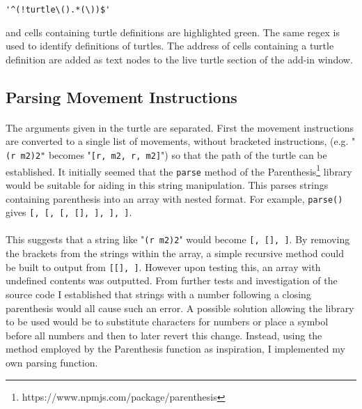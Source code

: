 \begin{verbatim}
'^(!turtle\().*(\))$'
\end{verbatim}

and cells containing turtle definitions are highlighted green. The same regex is used to identify definitions of turtles. The address of cells containing a turtle definition are added as text nodes to the live turtle section of the add-in window.

\subsection{Parsing Movement Instructions}

\paragraph{} The arguments given in the turtle are separated. First the movement instructions are converted to a single list of movements, without bracketed instructions, (e.g. "\texttt{(r m2)2"} becomes "\texttt{[r, m2, r, m2]}") so that the path of the turtle can be established. It initially seemed that the \texttt{parse} method of the Parenthesis\footnote{https://www.npmjs.com/package/parenthesis} library would be suitable for aiding in this string manipulation. This parses strings containing parenthesis into an array with nested format. For example, \texttt{parse()} gives \texttt{[, [\upquote{b[}, [, [], \upquote{\}}], \upquote{]}], \upquote{)}]}.

\paragraph{} This suggests that a string like "\texttt{(r m2)2}" would become \texttt{[\upquote{(}, [], ]}.  By removing the brackets from the strings within the array, a simple recursive method could be built to output \texttt{} from \texttt{[[], ]}. However upon testing this, an array with undefined contents was outputted. From further tests and investigation of the source code I established that strings with a number following a closing parenthesis would all cause such an error. A possible solution allowing the library to be used would be to substitute characters for numbers or place a symbol before all numbers and then to later revert this change. Instead, using the method employed by the Parenthesis function as inspiration, I implemented my own parsing function.


